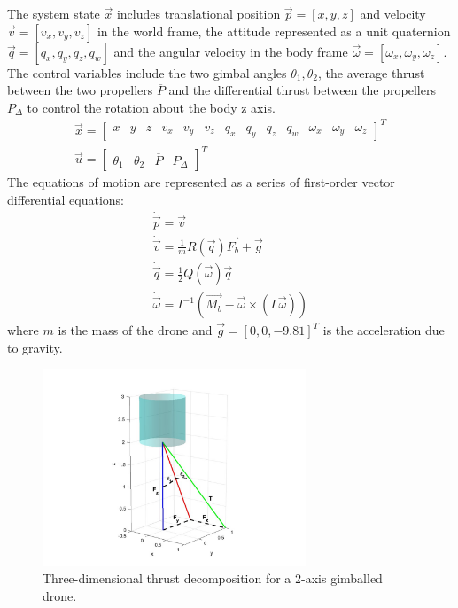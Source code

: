 \documentclass[]{article}
\newcommand{\pdiff}{P_{\Delta}}
\newcommand{\pavg}{\overline{P}}
\begin{document}
	The system state $\vec{x}$ includes translational position $\vec{p} = [x, y,  z]$ and velocity $\vec{v} = [v_x, v_y, v_z ]$  in the world frame, the attitude represented as a unit quaternion $\vec{q} = [q_x, q_y,  q_z, q_w]$ and the angular velocity in the body frame $ \vec{\omega} = [\omega_x, \omega_y, \omega_z]$. The control variables include the two gimbal angles $\theta_1, \theta_2 $, the average thrust between the two propellers $\pavg$ and the differential thrust between the propellers $\pdiff$ to control the rotation about the body z axis.
	\begin{gather*}
		\vec{x} =
		\begin{bmatrix}
			x & y & z & v_x & v_y & v_z & q_x & q_y & q_z & q_w & \omega_x & \omega_y & \omega_z
		\end{bmatrix}^T \\
		\vec{u} =
		\begin{bmatrix}
			\theta_1 & \theta_2 & \pavg & \pdiff
		\end{bmatrix}^T
	\end{gather*}
	The equations of motion are represented as a series of first-order vector differential equations:
	\begin{gather}
		\dot{\vec{p}}  = \vec{v}         \label{eqMotion1}	\\
		\dot{\vec{v}}  = \frac{1}{m}R(\vec{q})\vec{F_b}+\vec{g}  \label{eqMotion2} \\
		\dot{\vec{q}} = \frac{1}{2}Q(\vec{\omega})\vec{q}  \label{eqMotion3} \\
		\dot{\vec{\omega}} = I^{-1}\!\left(\vec{M_b} - \vec{\omega} \times (I\,\vec{\omega})\right) \label{eqMotion4}
	\end{gather}
	where $m$ is the mass of the drone and $\vec{g} = [0, 0, -9.81]^T$ is the acceleration due to gravity.
	\begin{figure}[H]
		\centering
		\includegraphics[width=0.7\textwidth]{figures/graph3d.jpg}
		\caption{Three-dimensional thrust decomposition for a 2-axis gimballed drone.}
		\label{fig:3dgraph}
	\end{figure}
\end{document}
